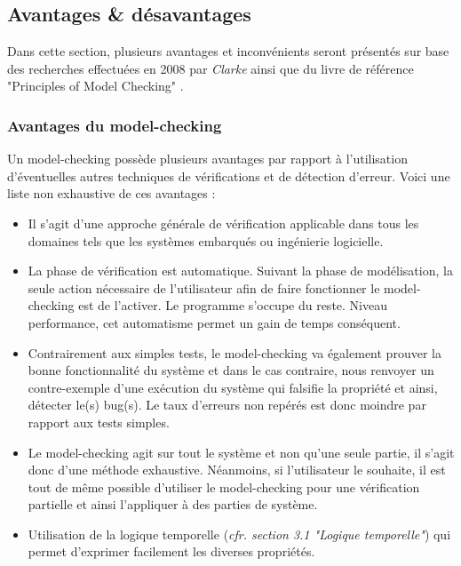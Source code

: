 \documentclass[runningheads,a4paper,10pt]{llncs}
\begin{document}

\subsection{Avantages \& désavantages}

Dans cette section, plusieurs avantages et inconvénients seront présentés sur base des recherches effectuées en 2008 par \textit{Clarke} \cite{Birth-MC} ainsi que du livre de référence "Principles of Model Checking" \cite{RefBook}.

\subsubsection{Avantages du model-checking}

Un model-checking possède plusieurs avantages par rapport à l'utilisation d'éventuelles autres techniques de vérifications et de détection d'erreur. Voici une liste non exhaustive de ces avantages : 

\begin{itemize}
\item Il s'agit d'une approche générale de vérification applicable dans tous les domaines tels que les systèmes embarqués ou ingénierie logicielle. 
\item La phase de vérification est automatique. Suivant la phase de modélisation, la seule action nécessaire de l'utilisateur afin de faire fonctionner le model-checking est de l'activer. Le programme s'occupe du reste. Niveau performance, cet automatisme permet un gain de temps conséquent. 
\item Contrairement aux simples tests, le model-checking va également prouver la bonne fonctionnalité du système et dans le cas contraire, nous renvoyer un contre-exemple d'une exécution du système qui falsifie la propriété et ainsi, détecter le(s) bug(s). Le taux d'erreurs non repérés est donc moindre par rapport aux tests simples. 
\item Le model-checking agit sur tout le système et non qu'une seule partie, il s'agit donc d'une méthode exhaustive. Néanmoins, si l'utilisateur le souhaite, il est tout de même possible d'utiliser le model-checking pour une vérification partielle et ainsi l'appliquer à des parties de système. 
\item Utilisation de la logique temporelle (\textit{cfr. section 3.1 "Logique temporelle"}) qui permet d'exprimer facilement les diverses propriétés. 
\end{itemize}
\end{document}
